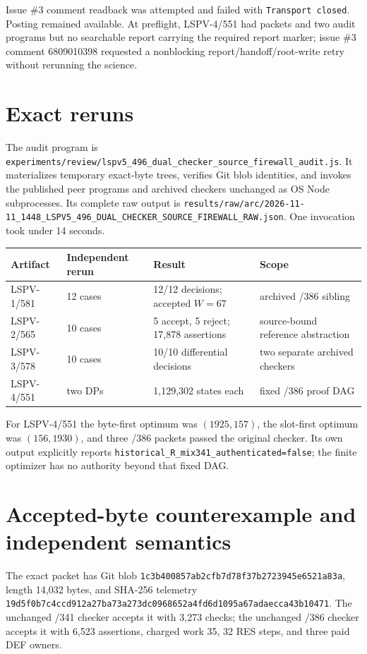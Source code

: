 \documentclass[11pt]{article}
\begin{document}
Issue \#3 comment readback was attempted and failed with
\texttt{Transport closed}. Posting remained available. At preflight,
LSPV-4/551 had packets and two audit programs but no searchable report
carrying the required report marker; issue \#3 comment 6809010398 requested
a nonblocking report/handoff/root-write retry without rerunning the science.

\section*{Exact reruns}
The audit program is
\texttt{experiments/review/lspv5\_496\_dual\_checker\_source\_firewall\_audit.js}.
It materializes temporary exact-byte trees, verifies Git blob identities,
and invokes the published peer programs and archived checkers unchanged as
OS Node subprocesses. Its complete raw output is
\texttt{results/raw/arc/2026-11-11\_1448\_LSPV5\_496\_DUAL\_CHECKER\_SOURCE\_FIREWALL\_RAW.json}.
One invocation took under 14 seconds.

\begin{center}
\begin{tabular}{@{}llll@{}}
\toprule
Artifact & Independent rerun & Result & Scope\\
\midrule
LSPV-1/581 & 12 cases & 12/12 decisions; accepted \(W=67\) &
archived /386 sibling\\
LSPV-2/565 & 10 cases & 5 accept, 5 reject; 17,878 assertions &
source-bound reference abstraction\\
LSPV-3/578 & 10 cases & 10/10 differential decisions &
two separate archived checkers\\
LSPV-4/551 & two DPs & 1,129,302 states each &
fixed /386 proof DAG\\
\bottomrule
\end{tabular}
\end{center}

For LSPV-4/551 the byte-first optimum was \((1925,157)\), the slot-first
optimum was \((156,1930)\), and three /386 packets passed the original
checker. Its own output explicitly reports
\texttt{historical\_R\_mix341\_authenticated=false}; the finite optimizer
has no authority beyond that fixed DAG.

\section*{Accepted-byte counterexample and independent semantics}
The exact packet has Git blob
\texttt{1c3b400857ab2cfb7d78f37b2723945e6521a83a}, length 14,032 bytes,
and SHA-256 telemetry
\texttt{19d5f0b7c4ccd912a27ba73a273dc0968652a4fd6d1095a67adaecca43b10471}.
The unchanged /341 checker accepts it with 3,273 checks; the unchanged /386
checker accepts it with 6,523 assertions, charged work 35, 32 RES steps,
and three paid DEF owners.
\end{document}

